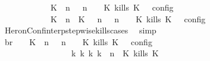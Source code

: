 \begin{isabellebody}
\ \ \ \ \ \ \ \ \ \ {\isacharequal}\ {\isasymlbrakk}\ {\isacharparenleft}{\isacharparenleft}K\ {\isasymnot}{\isasymUp}\ n{\isacharparenright}\ {\isacharhash}\ {\isasymGamma}{\isacharparenright}{\isacharcomma}\ n\ {\isasymturnstile}\ {\isasymPsi}\ {\isasymtriangleright}\ {\isacharparenleft}{\isacharparenleft}K\ kills\ K\ {\isacharhash}\ {\isasymPhi}{\isacharparenright}\ {\isasymrbrakk}\isactrlsub c\isactrlsub o\isactrlsub n\isactrlsub f\isactrlsub i\isactrlsub g\isanewline
\ \ \ \ \ \ \ \ \ \ {\isasymunion}\ {\isasymlbrakk}\ {\isacharparenleft}{\isacharparenleft}K\ {\isasymUp}\ n{\isacharparenright}\ {\isacharhash}\ {\isacharparenleft}K\ {\isasymnot}{\isasymUp}\ {\isasymge}\ n{\isacharparenright}\ {\isacharhash}\ {\isasymGamma}{\isacharparenright}{\isacharcomma}\ n\ {\isasymturnstile}\ {\isasymPsi}\ {\isasymtriangleright}\ {\isacharparenleft}{\isacharparenleft}K\ kills\ K\ {\isacharhash}\ {\isasymPhi}{\isacharparenright}\ {\isasymrbrakk}\isactrlsub c\isactrlsub o\isactrlsub n\isactrlsub f\isactrlsub i\isactrlsub g{\isacartoucheclose}\isanewline
\ \ \ \ \ \ \ \ \isamarkupfalse%
\ HeronConf{\isacharunderscore}interp{\isacharunderscore}stepwise{\isacharunderscore}kills{\isacharunderscore}cases\ \isamarkupfalse%
\ simp\isanewline
\ \ \ \ \ \ \isamarkupfalse%
\ \isamarkupfalse%
\ br{}{\isacharcolon}\ {\isacartoucheopen}{\isasymrho}\ {\isasymin}\ {\isasymlbrakk}\ {\isacharparenleft}{\isacharparenleft}K\ {\isasymnot}{\isasymUp}\ n{\isacharparenright}\ {\isacharhash}\ {\isasymGamma}{\isacharparenright}{\isacharcomma}\ n\ {\isasymturnstile}\ {\isasymPsi}\ {\isasymtriangleright}\ {\isacharparenleft}{\isacharparenleft}K\ kills\ K\ {\isacharhash}\ {\isasymPhi}{\isacharparenright}\ {\isasymrbrakk}\isactrlsub c\isactrlsub o\isactrlsub n\isactrlsub f\isactrlsub i\isactrlsub g\isanewline
\ \ \ \ \ \ \ \ \ \ \ \ \ \ \ \ {\isasymLongrightarrow}\ {\isasymexists}{\isasymGamma}\isactrlsub k\ {\isasymPsi}\isactrlsub k\ {\isasymPhi}\isactrlsub k\ k{\isachardot}\ {\isacharparenleft}{\isacharparenleft}{\isasymGamma}{\isacharcomma}\ n\ {\isasymturnstile}\ {\isacharparenleft}{\isacharparenleft}K\ kills\ K\ {\isacharhash}\ {\isasymPsi}{\isacharparenright}\ {\isasymtriangleright}\ {\isasymPhi}{\isacharparenright}\isanewline

\end{isabellebody}
